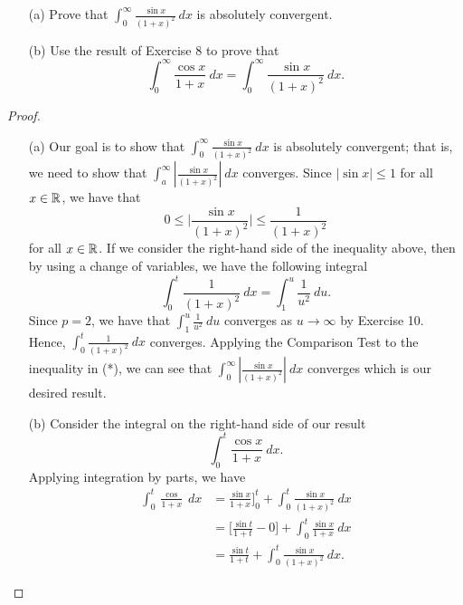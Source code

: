\documentclass[a4paper]{article}
\begin{document}
\begin{problem}
   \begin{enumerate}
       \item[(a)] Prove that \( \int_{ 0 }^{ \infty  }  \frac{ \sin x  }{ (1+x)^{2} }  \ dx  \) is absolutely convergent.
        \item[(b)] Use the result of Exercise 8 to prove that 
            \[  \int_{ 0 }^{ \infty  } \frac{ \cos x  }{  1 + x  }   \ dx = \int_{ 0 }^{ \infty  }  \frac{ \sin x  }{ (1+x)^{2} }  \ dx. \]
   \end{enumerate} 
\end{problem}
\begin{proof}
\begin{enumerate}
    \item[(a)] Our goal is to show that \( \int_{ 0 }^{ \infty  }  \frac{ \sin x  }{ (1+x)^{2} }  \ dx   \) is absolutely convergent; that is, we need to show that \( \int_{ a }^{ \infty  }  | \frac{ \sin x  }{  (1+x)^{2} }  |   \ dx  \) converges. Since \( | \sin x  | \leq 1  \) for all \( x \in \mathbb{R}  \), we have that 
        \[  0 \leq \Big| \frac{ \sin x  }{  (1 + x)^{2} }  \Big| \leq \frac{ 1  }{ (1 + x)^{2} } \tag{*}  \]
        for all \( x \in \mathbb{R}  \).
        If we consider the right-hand side of the inequality above, then by using a change of variables, we have the following integral
        \[  \int_{ 0  }^{ t  } \frac{ 1 }{ (1 + x)^{2} }  \ dx = \int_{ 1  }^{ u  } \frac{ 1 }{ u^{2} }  \ du. \]
        Since \( p = 2  \), we have that \( \int_{ 1 }^{ u } \frac{ 1 }{ u^{2} }  \ du  \) converges as \( u \to \infty   \) by Exercise 10. Hence, \( \int_{ 0 }^{ t } \frac{ 1 }{ (1+x)^{2} }  \ dx  \) converges. Applying the Comparison Test to the inequality in (*), we can see that \( \int_{ 0 }^{ \infty  } | \frac{ \sin x  }{  (1+x)^{2} }  |   \ dx  \) converges which is our desired result. 
    \item[(b)] Consider the integral on the right-hand side of our result
        \[  \int_{ 0 }^{ t } \frac{ \cos x  }{  1 + x  }  \ dx. \]
        Applying integration by parts, we have
    \begin{align*}
\int_{ 0 }^{ t }  \frac{ \cos  }{ 1 + x  }  \ dx &= \frac{ \sin x  }{ 1 + x  }  \Big]_{0}^{t} + \int_{ 0 }^{ t } \frac{ \sin x  }{  (1+x)^{2} }  \ dx \\
                                                 &= \Big[ \frac{ \sin t  }{  1 + t  }  - 0 \Big] + \int_{ 0 }^{ t }  \frac{ \sin x  }{  1 + x  }  \ dx \\
                                                 &= \frac{ \sin t  }{  1 + t  }  + \int_{ 0 }^{ t }  \frac{ \sin x  }{  (1+x)^{2} }  \ dx.

\end{align*}
\end{enumerate}
\end{proof}
\end{document}
